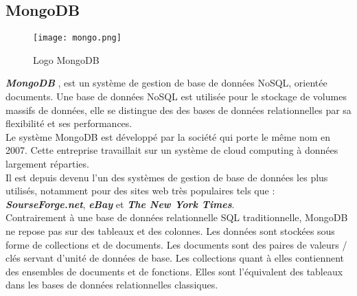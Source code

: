 \subsection{MongoDB}
\vspace{1cm}
\begin{figure}[H]
    \centering
    \texttt{[image: mongo.png]}
    \vspace{1cm}
    \captionsetup{justification=centering}
    \caption{Logo MongoDB}
    \label{fig:mongo_logo}
\end{figure}
\textit{\textbf{MongoDB}} \cite{mongodb} , est un système de gestion de base de données NoSQL, orientée documents. Une base de données NoSQL est utilisée pour le stockage de volumes massifs de données, elle se distingue des des bases de données relationnelles par sa flexibilité et ses performances.\\
\noindent Le système MongoDB est développé par la société qui porte le même nom en 2007. Cette entreprise travaillait sur un système de cloud computing à données largement réparties.\\
\noindent Il est depuis devenu l'un des systèmes de gestion de base de données les plus utilisés, notamment pour des sites web très populaires tels que : \textit{\textbf{SourseForge.net}}, \textit{\textbf{eBay}} et \textit{\textbf{The New York Times}}.\\
\noindent Contrairement à une base de données relationnelle SQL traditionnelle, MongoDB ne repose pas sur des tableaux et des colonnes. Les données sont stockées sous forme de collections et de documents.
Les documents sont des paires de valeurs / clés servant d'unité de données de base. Les collections quant à elles contiennent des ensembles de documents et de fonctions. Elles sont l'équivalent des tableaux dans les bases de données relationnelles classiques.
